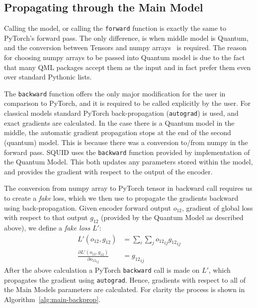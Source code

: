 \subsection{Propagating through the Main Model}
\label{subsec:squid-main-model}

Calling the model, or calling the \texttt{forward} function is exactly the same to PyTorch's forward pass.
The only difference, is when middle model is Quantum, and the conversion between Tensors and numpy arrays~\cite{numpy} is required.
The reason for choosing numpy arrays to be passed into Quantum model is due to the fact that many QML packages accept them as the input and in fact prefer them even over standard Pythonic lists.

The \texttt{backward} function offers the only major modification for the user in comparison to PyTorch, and it is required to be called explicitly by the user.
For classical models standard PyTorch back-propagation (\texttt{autograd}) is used, and exact gradients are calculated.
In the case there is a Quantum model in the middle, the automatic gradient propagation stops at the end of the second (quantum) model.
This is because there was a conversion to/from numpy in the forward pass.
SQUID uses the \texttt{backward} function provided by implementation of the Quantum Model.
This both updates any parameters stored within the model, and provides the gradient with respect to the output of the encoder.

The conversion from numpy array to PyTorch tensor in backward call requires us to create a \textit{fake} loss, which we then use to propagate the gradients backward using back-propagation.
Given encoder forward output $o_{12}$, gradient of global loss with respect to that output $g_{12}$ (provided by the Quantum Model as described above),
we define a \textit{fake loss} $L'$:
\begin{align}
    L'(o_{12}, g_{12}) &= \sum_i\sum_j {o_{12}}_{ij}{g_{12}}_{ij} \\
    \frac{\partial L'(o_{12}, g_{12})}{\partial {o_{12}}_{ij}} &= {g_{12}}_{ij}
\end{align}
After the above calculation a PyTorch \texttt{backward} call is made on $L'$, which propagates the gradient using \texttt{autograd}.
Hence, gradients with respect to all of the Main Models parameters are calculated.
For clarity the process is shown in Algorithm~\ref{alg:main-backprop}.

